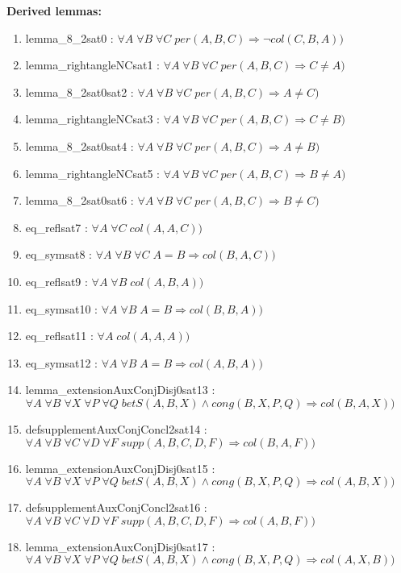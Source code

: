 \documentclass{article}
\begin{document}
\noindent 
{\bfseries Derived lemmas:} 
\begin{enumerate}
\item lemma\_8\_2sat0 : $\forall A\;\forall B\;\forall C\;per(A, B, C) \Rightarrow \neg col(C, B, A))$
\item lemma\_rightangleNCsat1 : $\forall A\;\forall B\;\forall C\;per(A, B, C) \Rightarrow C \neq A)$
\item lemma\_8\_2sat0sat2 : $\forall A\;\forall B\;\forall C\;per(A, B, C) \Rightarrow A \neq C)$
\item lemma\_rightangleNCsat3 : $\forall A\;\forall B\;\forall C\;per(A, B, C) \Rightarrow C \neq B)$
\item lemma\_8\_2sat0sat4 : $\forall A\;\forall B\;\forall C\;per(A, B, C) \Rightarrow A \neq B)$
\item lemma\_rightangleNCsat5 : $\forall A\;\forall B\;\forall C\;per(A, B, C) \Rightarrow B \neq A)$
\item lemma\_8\_2sat0sat6 : $\forall A\;\forall B\;\forall C\;per(A, B, C) \Rightarrow B \neq C)$
\item eq\_reflsat7 : $\forall A\;\forall C\;col(A, A, C))$
\item eq\_symsat8 : $\forall A\;\forall B\;\forall C\;A = B \Rightarrow col(B, A, C))$
\item eq\_reflsat9 : $\forall A\;\forall B\;col(A, B, A))$
\item eq\_symsat10 : $\forall A\;\forall B\;A = B \Rightarrow col(B, B, A))$
\item eq\_reflsat11 : $\forall A\;col(A, A, A))$
\item eq\_symsat12 : $\forall A\;\forall B\;A = B \Rightarrow col(A, B, A))$
\item lemma\_extensionAuxConjDisj0sat13 : $\forall A\;\forall B\;\forall X\;\forall P\;\forall Q\;betS(A, B, X)\wedge cong(B, X, P, Q) \Rightarrow col(B, A, X))$
\item defsupplementAuxConjConcl2sat14 : $\forall A\;\forall B\;\forall C\;\forall D\;\forall F\;supp(A, B, C, D, F) \Rightarrow col(B, A, F))$
\item lemma\_extensionAuxConjDisj0sat15 : $\forall A\;\forall B\;\forall X\;\forall P\;\forall Q\;betS(A, B, X)\wedge cong(B, X, P, Q) \Rightarrow col(A, B, X))$
\item defsupplementAuxConjConcl2sat16 : $\forall A\;\forall B\;\forall C\;\forall D\;\forall F\;supp(A, B, C, D, F) \Rightarrow col(A, B, F))$
\item lemma\_extensionAuxConjDisj0sat17 : $\forall A\;\forall B\;\forall X\;\forall P\;\forall Q\;betS(A, B, X)\wedge cong(B, X, P, Q) \Rightarrow col(A, X, B))$

\end{enumerate}
\end{document}
